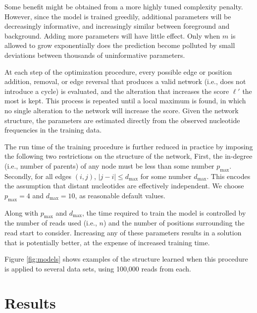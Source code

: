 \documentclass{bioinfo}
\begin{document}
Some benefit might be obtained from a more highly tuned complexity penalty.
However, since the model is trained greedily, additional parameters will be
decreasingly informative, and increasingly similar between foreground and
background. Adding more parameters will have little effect.  Only when $m$ is
allowed to grow exponentially does the prediction become polluted by small
deviations between thousands of uninformative parameters. 

At each step of the optimization procedure, every possible edge or position
addition, removal, or edge reversal that produces a valid network (i.e., does not
introduce a cycle) is evaluated, and the alteration that increases the score
$\ell'$ the most is kept.  This process is repeated until a local maximum is
found, in which no single alteration to the network will increase the score.
Given the network structure, the parameters are estimated directly from the
observed nucleotide frequencies in the training data.

The run time of the training procedure is further reduced in practice by
imposing the following two restrictions on the structure of the network, First,
the in-degree (i.e., number of parents) of any node must be less than some
number $p_{\text{max}}$. Secondly, for all edges $(i,j)$, $|j - i| \le
d_{\text{max}}$ for some number $d_{\text{max}}$.  This encodes the assumption
that distant nucleotides are effectively independent. We choose $p_{\text{max}}
= 4$ and $d_{\text{max}} = 10$, as reasonable default values.

Along with $p_{\text{max}}$ and $d_{\text{max}}$, the time required to train the
model is controlled by the number of reads used (i.e., $n$) and the number of
positions surrounding the read start to consider. Increasing any of these
parameters results in a  solution that is potentially better, at
the expense of increased training time.

Figure \ref{fig:models} shows examples of the structure learned when this
procedure is applied to several data sets, using 100,000 reads from each.


\section{Results}
\end{document}
